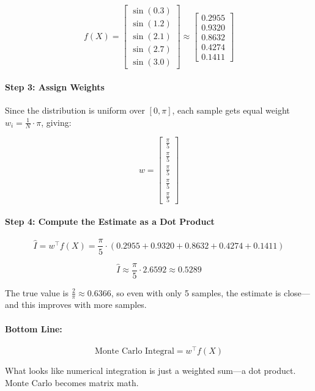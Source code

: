 \[
f(X) =
\begin{bmatrix}
\sin(0.3) \\
\sin(1.2) \\
\sin(2.1) \\
\sin(2.7) \\
\sin(3.0)
\end{bmatrix}
\approx
\begin{bmatrix}
0.2955 \\
0.9320 \\
0.8632 \\
0.4274 \\
0.1411
\end{bmatrix}
\]

\paragraph{Step 3: Assign Weights}

Since the distribution is uniform over \( [0, \pi] \), each sample gets equal weight \( w_i = \frac{1}{N} \cdot \pi \), giving:

\[
w =
\begin{bmatrix}
\frac{\pi}{5} \\
\frac{\pi}{5} \\
\frac{\pi}{5} \\
\frac{\pi}{5} \\
\frac{\pi}{5}
\end{bmatrix}
\]

\paragraph{Step 4: Compute the Estimate as a Dot Product}

\[
\hat{I} = w^\top f(X) = \frac{\pi}{5} \cdot (0.2955 + 0.9320 + 0.8632 + 0.4274 + 0.1411)
\]

\[
\hat{I} \approx \frac{\pi}{5} \cdot 2.6592 \approx 0.5289
\]

The true value is \( \frac{2}{\pi} \approx 0.6366 \), so even with only 5 samples, the estimate is close—and this improves with more samples.

\paragraph{Bottom Line:}

\[
\text{Monte Carlo Integral} = w^\top f(X)
\]

What looks like numerical integration is just a weighted sum—a dot product. Monte Carlo becomes matrix math.





